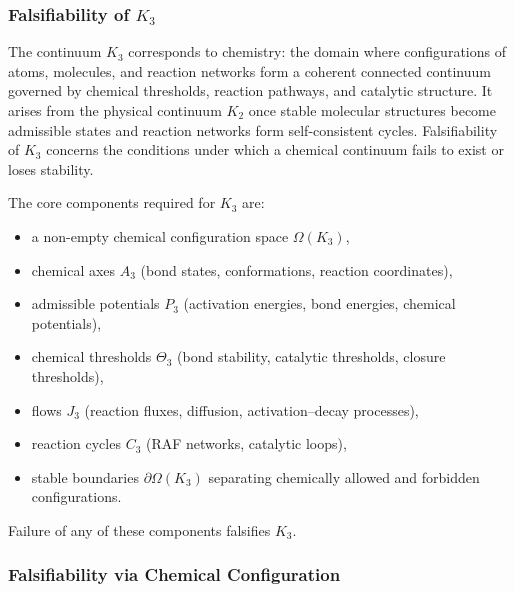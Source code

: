 
\subsubsection{Falsifiability of \texorpdfstring{$K_3$}{K_3}}
\label{sec:falsifiability-k3}

The continuum $K_3$ corresponds to chemistry: the domain where
configurations of atoms, molecules, and reaction networks form a
coherent connected continuum governed by chemical thresholds,
reaction pathways, and catalytic structure.
It arises from the physical continuum $K_2$ once stable molecular
structures become admissible states and reaction networks form
self-consistent cycles.
Falsifiability of $K_3$ concerns the conditions under which a chemical
continuum fails to exist or loses stability.

The core components required for $K_3$ are:
\begin{itemize}
    \item a non-empty chemical configuration space $\Omega(K_3)$,
    \item chemical axes $A_3$ (bond states, conformations, reaction
    coordinates),
    \item admissible potentials $P_3$ (activation energies,
    bond energies, chemical potentials),
    \item chemical thresholds $\Theta_3$ (bond stability,
    catalytic thresholds, closure thresholds),
    \item flows $J_3$ (reaction fluxes, diffusion, activation–decay
    processes),
    \item reaction cycles $C_3$ (RAF networks, catalytic loops),
    \item stable boundaries $\partial\Omega(K_3)$ separating chemically
    allowed and forbidden configurations.
\end{itemize}

Failure of any of these components falsifies $K_3$.



\subsubsection{Falsifiability via Chemical Configuration}

